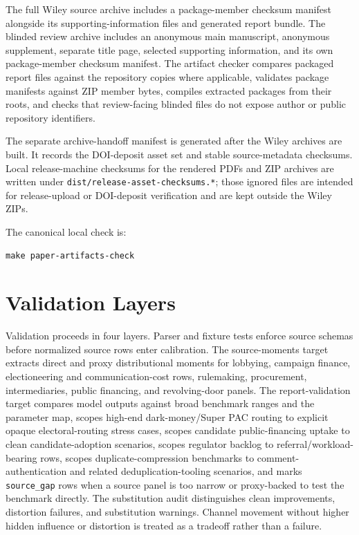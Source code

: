 The full Wiley source archive includes a package-member checksum manifest alongside its supporting-information files and generated report bundle. The blinded review archive includes an anonymous main manuscript, anonymous supplement, separate title page, selected supporting information, and its own package-member checksum manifest. The artifact checker compares packaged report files against the repository copies where applicable, validates package manifests against ZIP member bytes, compiles extracted packages from their roots, and checks that review-facing blinded files do not expose author or public repository identifiers.

The separate archive-handoff manifest is generated after the Wiley archives are built. It records the DOI-deposit asset set and stable source-metadata checksums. Local release-machine checksums for the rendered PDFs and ZIP archives are written under \texttt{dist/release-asset-checksums.*}; those ignored files are intended for release-upload or DOI-deposit verification and are kept outside the Wiley ZIPs.

The canonical local check is:

\begin{verbatim}
make paper-artifacts-check
\end{verbatim}

\section{Validation Layers}

Validation proceeds in four layers. Parser and fixture tests enforce source schemas before normalized source rows enter calibration. The source-moments target extracts direct and proxy distributional moments for lobbying, campaign finance, electioneering and communication-cost rows, rulemaking, procurement, intermediaries, public financing, and revolving-door panels. The report-validation target compares model outputs against broad benchmark ranges and the parameter map, scopes high-end dark-money/Super PAC routing to explicit opaque electoral-routing stress cases, scopes candidate public-financing uptake to clean candidate-adoption scenarios, scopes regulator backlog to referral/workload-bearing rows, scopes duplicate-compression benchmarks to comment-authentication and related deduplication-tooling scenarios, and marks \texttt{source\_gap} rows when a source panel is too narrow or proxy-backed to test the benchmark directly. The substitution audit distinguishes clean improvements, distortion failures, and substitution warnings. Channel movement without higher hidden influence or distortion is treated as a tradeoff rather than a failure.

